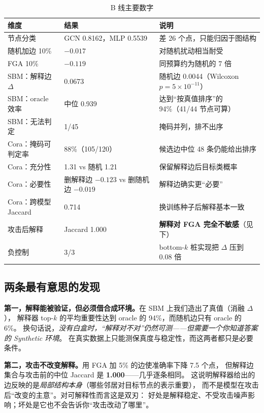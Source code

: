 \begin{table}[H]
\centering
\caption{B 线主要数字}
\label{tab:appB}
\small
\setlength{\tabcolsep}{3pt}
\begin{tabular}{lll}
\toprule
维度 & 结果 & 说明 \\
\midrule
节点分类 & GCN 0.8162，MLP 0.5539 & 差 26 个点，只能归因于图结构 \\
随机加边 10\% & $-0.017$ & 对随机扰动相当耐受 \\
FGA 10\% & $-0.119$ & 同预算约为随机的 7 倍 \\
\midrule
SBM：解释边 $\Delta$ & 0.0673 & 随机边 0.0044（Wilcoxon $p=5\times10^{-11}$） \\
SBM：oracle 效率 & 中位 0.939 & 达到“按真值排序”的 94\%（41/44 节点可算） \\
SBM：无法判定 & 1/45 & 掩码并列，排不出序 \\
\midrule
Cora：掩码可判定率 & 88\%（105/120） & 候选边中位 48 条仍能给出排序 \\
Cora：充分性 & 1.31 vs 随机 1.21 & 保留解释边后目标类概率 \\
Cora：必要性 & 删解释边 $-0.123$ vs 删随机边 $-0.019$ & 解释边确实更“必要” \\
Cora：跨模型 Jaccard & 0.714 & 换训练种子后解释基本一致 \\
\midrule
攻击后解释 & Jaccard 1.000 & \textbf{解释对 FGA 完全不敏感}（见下） \\
负控制 & 3/3 & bottom-$k$ 桩实现把 $\Delta$ 压到 0.08 倍 \\
\bottomrule
\end{tabular}
\end{table}

\subsection{两条最有意思的发现}

\textbf{第一，解释能被验证，但必须借合成环境。}在 SBM 上我们造出了真值（消融 $\Delta$），
解释器 top-$k$ 的平均重要性达到 oracle 的 94\%，而随机边只有 oracle 的 6\%。
换句话说，\emph{没有白盒时，“解释对不对”仍然可测——但需要一个你知道答案的 Synthetic 环境}。
在真实数据上只能测保真度与稳定性，而这两者都只是必要条件。

\textbf{第二，攻击不改变解释。}用 FGA 加 5\% 的边使准确率下降 7.5 个点，
但解释边集合与攻击前的中位 Jaccard 是 \textbf{1.000}——几乎逐条相同。
这说明解释器给出的边反映的是\emph{局部结构本身}（哪些邻居对目标节点的表示重要），
而不是模型在攻击后“改变的主意”。对可解释性而言这是双刃：
好处是解释稳定、不受攻击噪声影响；坏处是它也不会告诉你“攻击改动了哪里”。

